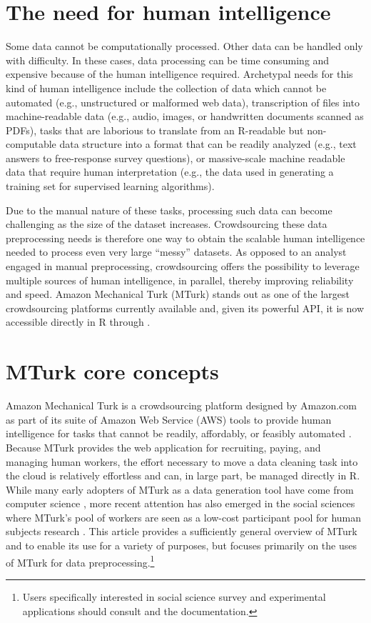\section{The need for human intelligence}
Some data cannot be computationally processed. Other data can be handled only with difficulty. In these cases, data processing can be time consuming and expensive because of the human intelligence required. Archetypal needs for this kind of human intelligence include the collection of data which cannot be automated (e.g., unstructured or malformed web data), transcription of files into machine-readable data (e.g., audio, images, or handwritten documents scanned as PDFs), tasks that are laborious to translate from an R-readable but non-computable data structure into a format that can be readily analyzed (e.g., text answers to free-response survey questions), or massive-scale machine readable data that require human interpretation (e.g., the data used in generating a training set for supervised learning algorithms).

Due to the manual nature of these tasks, processing such data can become challenging as the size of the dataset increases. Crowdsourcing these data preprocessing needs is therefore one way to obtain the scalable human intelligence needed to process even very large ``messy'' datasets. As opposed to an analyst engaged in manual preprocessing, crowdsourcing offers the possibility to leverage multiple sources of human intelligence, in parallel, thereby improving reliability and speed. Amazon Mechanical Turk (MTurk) stands out as one of the largest crowdsourcing platforms currently available and, given its powerful API, it is now accessible directly in R through .

\section{MTurk core concepts}
Amazon Mechanical Turk is a crowdsourcing platform designed by Amazon.com as part of its suite of Amazon Web Service (AWS) tools to provide human intelligence for tasks that cannot be readily, affordably, or feasibly automated \citep{Amazon2012}. Because MTurk provides the web application for recruiting, paying, and managing human workers, the effort necessary to move a data cleaning task into the cloud is relatively effortless and can, in large part, be managed directly in R. While many early adopters of MTurk as a data generation tool have come from computer science \citep{MasonSuri2011, KitturChiSuh2008}, more recent attention has also emerged in the social sciences where MTurk's pool of workers are seen as a low-cost participant pool for human subjects research \citep{BuhrmesterKwangGosling2011, BerinskyHuberLenz2010, PaolacciChandlerStern2010}. This article provides a sufficiently general overview of MTurk and  to enable its use for a variety of purposes, but focuses primarily on the uses of MTurk for data preprocessing.\footnote{Users specifically interested in social science survey and experimental applications should consult \citet{Leeper2013a} and the  documentation.}

